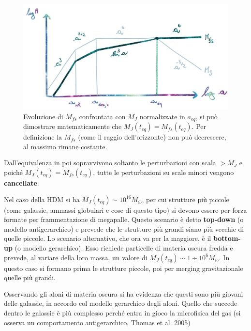 \begin{figure}[H]
    \centering
    \includegraphics[width=.8 \textwidth]{Pictures/7/mfscold.jpg}
    \caption{Evoluzione di $M_{fs}$ confrontata con $M_J$ normalizzate in $a_{eq}$, si può dimostrare matematicamente che $M_J(t_{eq})=M_{fs}(t_{eq})$. Per definizione la $M_{fs}$ (come il raggio dell'orizzonte) non può decrescere, al massimo rimane costante.} \label{fig:7mfscold}
\end{figure}

\begin{definition}
 Dall'equivalenza in poi sopravvivono soltanto le perturbazioni con scala $>M_J$ e poiché $M_J(t_{eq})=M_{fs}(t_{eq})$, tutte le perturbazioni su scale minori vengono \textbf{cancellate}.
\end{definition}

Nel caso della HDM si ha $M_J(t_{eq})\sim 10^{16}M_\odot$, per cui strutture più piccole (come galassie, ammassi globulari e cose di questo tipo) si devono essere per forza formate per frammentazione di megapalle. Questo scenario è detto \textbf{top-down} (o modello antigerarchico) e prevede che le strutture più grandi siano più vecchie di quelle piccole. Lo scenario alternativo, che ora va per la maggiore, è il \textbf{bottom-up} (o modello gerarchico). Esso richiede particelle di materia oscura fredda e prevede, al variare della loro massa, un valore di $M_J(t_{eq})\sim 1\div 10^{6}M_\odot$. In questo caso si formano prima le strutture piccole, poi per merging gravitazionale quelle più grandi. 

Osservando gli aloni di materia oscura si ha evidenza che questi sono più giovani delle galassie, in accordo col modello gerarchico degli aloni. Quello che succede dentro le galassie è più complesso perché entra in gioco la microfisica del gas (si osserva un comportamento antigerarchico, Thomas et al. 2005)









